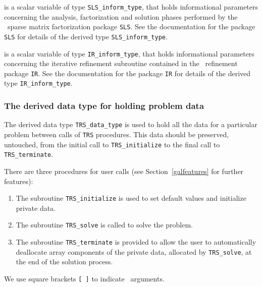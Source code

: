 \documentclass{galahad}
\newcommand{\packagename}{TRS}
\begin{document}
\begin{description}
 is a scalar variable of type {\tt SLS\_inform\_type},
that holds informational parameters concerning the analysis, factorization
and solution phases performed by
the \galahad\ sparse matrix factorization package {\tt SLS}.
See the documentation for the package {\tt SLS} for details of the
derived type {\tt SLS\_inform\_type}.

 is a scalar variable of type {\tt IR\_inform\_type},
that holds informational parameters concerning the iterative refinement
subroutine contained in the \galahad\ refinement package {\tt IR}.
See the documentation for the package {\tt IR} for details of the
derived type {\tt IR\_inform\_type}.


\end{description}


\subsubsection{The derived data type for holding problem data}\label{typedata}
The derived data type
{\tt \packagename\_data\_type}
is used to hold all the data for a particular problem between calls of
{\tt \packagename} procedures.
This data should be preserved, untouched, from the initial call to
{\tt \packagename\_initialize}
to the final call to
{\tt \packagename\_terminate}.


\galarguments
There are three procedures for user calls
(see Section~\ref{galfeatures} for further features):

\begin{enumerate}
\item The subroutine
      {\tt \packagename\_initialize}
      is used to set default values and initialize private data.
\item The subroutine
      {\tt \packagename\_solve}
      is called to solve the problem.
\item The subroutine
      {\tt \packagename\_terminate}
      is provided to allow the user to automatically deallocate array
       components of the private data, allocated by
       {\tt \packagename\_solve},
       at the end of the solution process.
\end{enumerate}
We use square brackets {\tt [ ]} to indicate \optional\ arguments.

\end{document}
